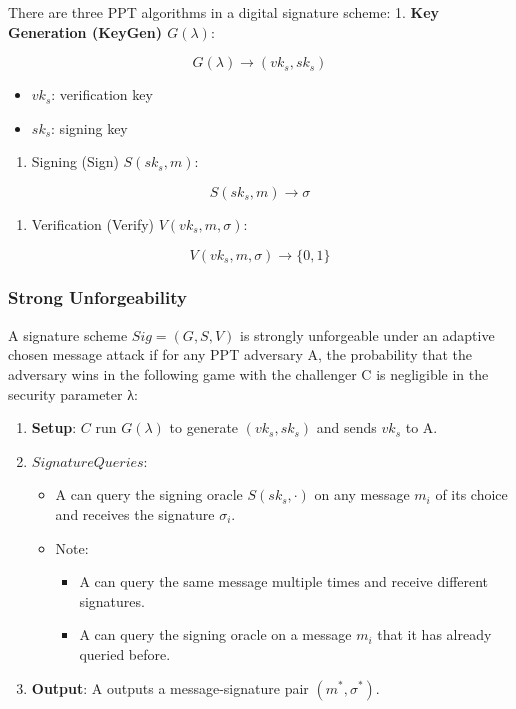 \documentclass[
]{article}
\providecommand{\tightlist}{%
  \setlength{\itemsep}{0pt}\setlength{\parskip}{0pt}}
\begin{document}
There are three PPT algorithms in a digital signature scheme: 1.
\textbf{Key Generation (KeyGen) \(G(\lambda)\)}:

\[G(\lambda) \rightarrow ({vk}_s, {sk}_s)\]

\begin{itemize}
\tightlist
\item
  \({vk}_s\): verification key
\item
  \({sk}_s\): signing key
\end{itemize}

\begin{enumerate}
\def\labelenumi{\arabic{enumi}.}
\setcounter{enumi}{1}
\tightlist
\item
  Signing (Sign) \(S({sk}_s, m)\):
\end{enumerate}

\[S({sk}_s, m) \rightarrow \sigma\]

\begin{enumerate}
\def\labelenumi{\arabic{enumi}.}
\setcounter{enumi}{2}
\tightlist
\item
  Verification (Verify) \(V({vk}_s, m, \sigma)\):
\end{enumerate}

\[V({vk}_s, m, \sigma) \rightarrow \{0, 1\}\]

\hypertarget{strong-unforgeability}{%
\subsubsection{Strong Unforgeability}\label{strong-unforgeability}}

A signature scheme \(Sig = (G, S, V)\) is strongly unforgeable under an
adaptive chosen message attack if for any PPT adversary A, the
probability that the adversary wins in the following game with the
challenger C is negligible in the security parameter λ:

\begin{enumerate}
\def\labelenumi{\arabic{enumi}.}
\item
  \textbf{Setup}: \(C\) run \(G(\lambda)\) to generate
  \(({vk}_s, {sk}_s)\) and sends \({vk}_s\) to A.
\item
  \(Signature Queries\):

  \begin{itemize}
  \tightlist
  \item
    A can query the signing oracle \(S({sk}_s, \cdot)\) on any message
    \(m_i\) of its choice and receives the signature \(\sigma_i\).
  \item
    Note:

    \begin{itemize}
    \tightlist
    \item
      A can query the same message multiple times and receive different
      signatures.
    \item
      A can query the signing oracle on a message \(m_i\) that it has
      already queried before.
    \end{itemize}
  \end{itemize}
\item
  \textbf{Output}: A outputs a message-signature pair
  \((m^*, \sigma^*)\).
\end{enumerate}
\end{document}
